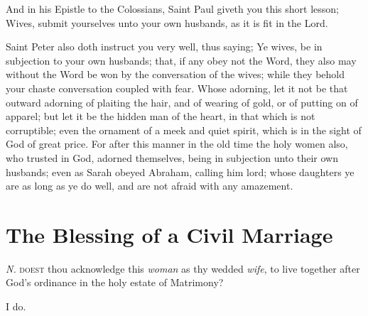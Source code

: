 And in his Epistle to the Colossians, Saint Paul giveth you this short lesson; Wives, submit yourselves unto your own husbands, as it is fit in the Lord.

Saint Peter also doth instruct you very well, thus saying; Ye wives, be in subjection to your own husbands; that, if any obey not the Word, they also may without the Word be won by the conversation of the wives; while they behold your chaste conversation coupled with fear. Whose adorning, let it not be that outward adorning of plaiting the hair, and of wearing of gold, or of putting on of apparel; but let it be the hidden man of the heart, in that which is not corruptible; even the ornament of a meek and quiet spirit, which is in the sight of God of great price. For after this manner in the old time the holy women also, who trusted in God, adorned themselves, being in subjection unto their own husbands; even as Sarah obeyed Abraham, calling him lord; whose daughters ye are as long as ye do well, and are not afraid with any amazement.


\bigskip
\section{The Blessing of a Civil Marriage}





\smallskip
\centerline{}

\lettrine{\emph{N.}}{ doest} thou acknowledge this \emph{woman} as thy wedded \emph{wife}, to live together after God’s ordinance in the holy estate of Matrimony? 

\centerline{\R I do.}


